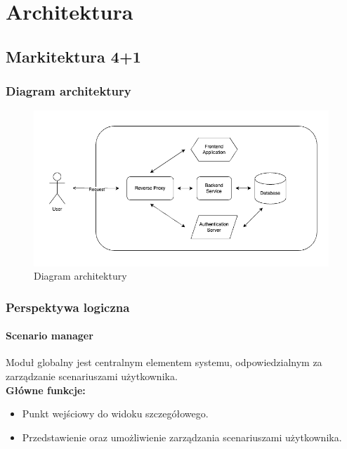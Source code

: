\chapter{Architektura}

\section{Markitektura 4+1}

\subsection{Diagram architektury}

\begin{figure}[h!]
    \centering
    \includegraphics[width=0.99\textwidth]{resources/local/diagram-architektury.png}
    \caption{Diagram architektury}
\end{figure}

\subsection{Perspektywa logiczna}

\subsubsection*{Scenario manager}
Moduł globalny jest centralnym elementem systemu, odpowiedzialnym za zarządzanie scenariuszami użytkownika. \\

\textbf{Główne funkcje:}
\begin{itemize}
    \item Punkt wejściowy do widoku szczegółowego.
    \item Przedstawienie oraz umożliwienie zarządzania scenariuszami użytkownika.
\end{itemize}

